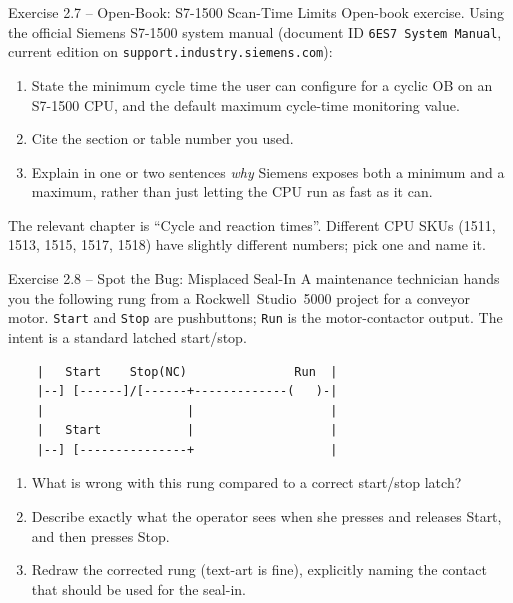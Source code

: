 \documentclass[11pt,a4paper]{article}
\begin{document}
\begin{taskbox}{Exercise 2.7 -- Open-Book: S7-1500 Scan-Time Limits}
Open-book exercise. Using the official Siemens S7-1500 system manual
(document ID \texttt{6ES7~System Manual}, current edition on
\texttt{support.industry.siemens.com}):
\begin{enumerate}
  \item State the minimum cycle time the user can configure for a cyclic OB
    on an S7-1500 CPU, and the default maximum cycle-time monitoring value.
  \item Cite the section or table number you used.
  \item Explain in one or two sentences \emph{why} Siemens exposes both a
    minimum and a maximum, rather than just letting the CPU run as fast as
    it can.
\end{enumerate}
\begin{hintbox}
The relevant chapter is ``Cycle and reaction times''. Different CPU SKUs
(1511, 1513, 1515, 1517, 1518) have slightly different numbers; pick one
and name it.
\end{hintbox}
\end{taskbox}

\begin{taskbox}{Exercise 2.8 -- Spot the Bug: Misplaced Seal-In}
A maintenance technician hands you the following rung from a
Rockwell~Studio~5000 project for a conveyor motor. \texttt{Start} and
\texttt{Stop} are pushbuttons; \texttt{Run} is the motor-contactor output.
The intent is a standard latched start/stop.
\begin{verbatim}
    |   Start    Stop(NC)               Run  |
    |--] [------]/[------+-------------(   )-|
    |                    |                   |
    |   Start            |                   |
    |--] [---------------+                   |
\end{verbatim}
\begin{enumerate}
  \item What is wrong with this rung compared to a correct start/stop
    latch?
  \item Describe exactly what the operator sees when she presses and
    releases Start, and then presses Stop.
  \item Redraw the corrected rung (text-art is fine), explicitly naming the
    contact that should be used for the seal-in.
\end{enumerate}
\end{taskbox}
\end{document}

